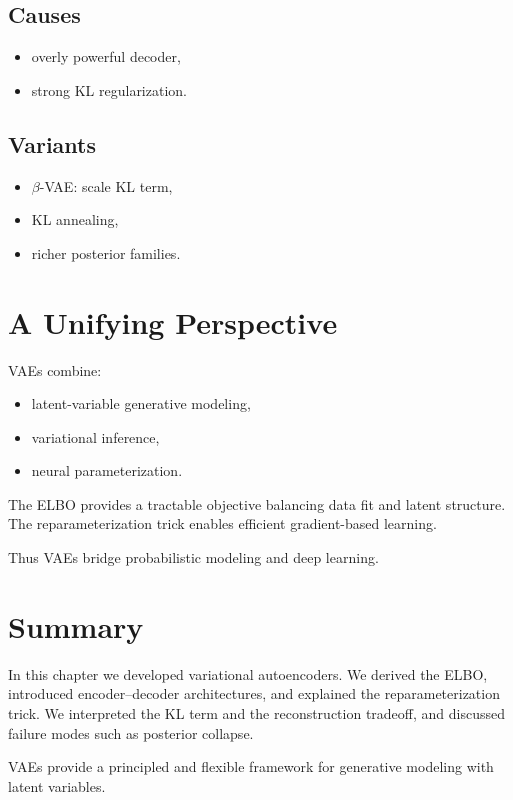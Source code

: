 \subsection{Causes}

\begin{itemize}
    \item overly powerful decoder,
    \item strong KL regularization.
\end{itemize}

\subsection{Variants}

\begin{itemize}
    \item $\beta$-VAE: scale KL term,
    \item KL annealing,
    \item richer posterior families.
\end{itemize}

\section{A Unifying Perspective}

VAEs combine:
\begin{itemize}
    \item latent-variable generative modeling,
    \item variational inference,
    \item neural parameterization.
\end{itemize}

The ELBO provides a tractable objective balancing data fit and latent structure. The reparameterization trick enables efficient gradient-based learning.

Thus VAEs bridge probabilistic modeling and deep learning.

\section{Summary}

In this chapter we developed variational autoencoders. We derived the ELBO, introduced encoder--decoder architectures, and explained the reparameterization trick. We interpreted the KL term and the reconstruction tradeoff, and discussed failure modes such as posterior collapse.

VAEs provide a principled and flexible framework for generative modeling with latent variables.
